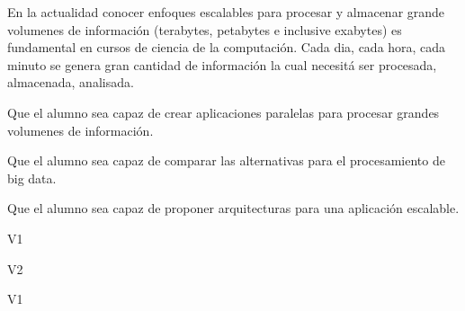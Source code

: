 \begin{syllabus}


\begin{justification}
En la actualidad conocer enfoques escalables para procesar y almacenar grande volumenes de información (terabytes, petabytes e inclusive exabytes) es fundamental en cursos de ciencia de la computación. Cada dia, cada hora, cada minuto se genera gran cantidad de información la cual necesitá ser procesada, almacenada, analisada.
\end{justification}

\begin{goals}
\item Que el alumno sea capaz de crear aplicaciones paralelas para procesar grandes volumenes de información.
\item Que el alumno sea capaz de comparar las alternativas para el procesamiento de big data.
\item Que el alumno sea capaz de proponer arquitecturas para una aplicación escalable.
\end{goals}

\begin{outcomes}{V1}
    \item {} 
    \item {} 
    \item {} 
    \item {} 
\end{outcomes}

\begin{outcomes}{V2}
    \item {}
    \item {} 
    \item {} 
\end{outcomes}

\begin{competences}{V1}
    \item {}
    \item {} 
    \item {} 
    \item {} 
    \item {} 
\end{competences}


\end{syllabus}
